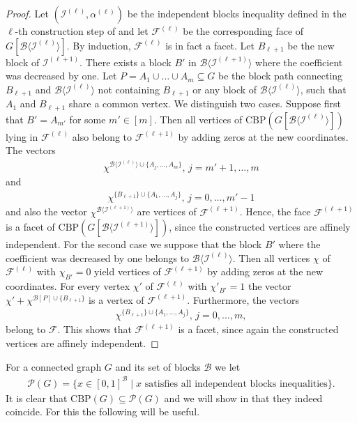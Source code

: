 \documentclass[12pt]{amsart}
\newcommand{\CBP}{\mathrm{CBP}}
\renewcommand{\P}{\mathcal{P}}
\newcommand{\I}{\mathcal{I}}
\newcommand{\B}{\mathcal{B}}
\newcommand{\F}{\mathcal{F}}
\begin{document}
\begin{proof}
    Let $(\I^{(\ell)},\alpha^{(\ell)})$ be the independent blocks inequality defined in the $\ell$-th construction step of  and let $\F^{(\ell)}$ be the corresponding face of $G[\B\langle\I^{(\ell)}\rangle]$. By induction, $\F^{(\ell)}$ is in fact a facet. Let $B_{\ell+1}$ be the new block of $\I^{(\ell+1)}$. There exists a block $B'$ in $\B\langle\I^{(\ell+1)}\rangle$ where the coefficient was decreased by one. Let $P=A_1 \cup \ldots \cup A_m \subseteq G$ be the block path connecting $B_{\ell+1}$ and $\B\langle \I^{(\ell)} \rangle$ not containing $B_{\ell+1}$ or any block of $\B\langle \I^{(\ell)} \rangle$, such that $A_1$ and $B_{\ell+1}$ share a common vertex. We distinguish two cases. Suppose first that $B'=A_{m'}$ for some $m' \in [m]$. Then all vertices of $\CBP(G[\B\langle \I^{(\ell)} \rangle])$ lying in $\F^{(\ell)}$ also belong to $\F^{(\ell+1)}$ by adding zeros at the new coordinates. The vectors
    \begin{align*}
        \chi^{\B\langle \I^{(\ell)} \rangle \cup \{A_j,\ldots,A_m\}}, \, j=m'+1,\ldots,m
    \end{align*}
    and
    \begin{align*}
        \chi^{\{B_{\ell+1}\} \cup \{A_1,\ldots,A_j\}}, \, j=0,\ldots, m'-1
    \end{align*}
    and also the vector $\chi^{\B\langle\I^{(\ell+1)}\rangle}$ are vertices of $\F^{(\ell+1)}$. Hence, the face $\F^{(\ell+1)}$ is a facet of $\CBP(G[\B\langle\I^{(\ell+1)}\rangle])$, since the constructed vertices are affinely independent. For the second case we suppose that the block $B'$ where the coefficient was decreased by one belongs to $\B\langle \I^{(\ell)} \rangle$. Then all vertices $\chi$ of $\F^{(\ell)}$ with $\chi_{B'}=0$ yield vertices of $\F^{(\ell+1)}$ by adding zeros at the new coordinates. For every vertex $\chi'$ of $\F^{(\ell)}$ with $\chi'_{B'}=1$ the vector $\chi'+\chi^{\B[P] \cup \{B_{\ell+1}\}}$ is a vertex of $\F^{(\ell+1)}$. Furthermore, the vectors
    \begin{align*}
        \chi^{\{B_{\ell+1}\} \cup \{A_1,\ldots,A_j\}}, \, j=0,\ldots,m,
    \end{align*}
    belong to $\mathcal{F}$. This shows that $\F^{(\ell+1)}$ is a facet, since again the constructed vertices are affinely independent.
\end{proof}

For a connected graph $G$ and its set of blocks $\B$ we let
\begin{align*}
    \P(G)=\{ x \in [0,1]^{\B} \mid x \text{ satisfies all independent blocks inequalities} \}.
\end{align*}
It is clear that $\CBP(G) \subseteq \P(G)$ and we will show in  that they indeed coincide. For this the following will be useful.
\end{document}
